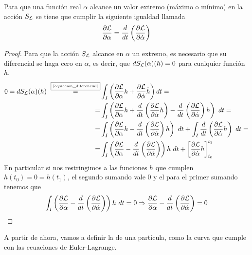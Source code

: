 \begin{theorem}
	Para que una función real $\alpha$ alcance un valor extremo (máximo o mínimo) en la acción $S_{\mathcal{L}}$ se tiene que cumplir la siguiente igualdad llamada 
	\begin{equation}
		\label{eq:euler-lagrange}
		\frac{\partial \mathcal{L}}{\partial \alpha}=\frac{d}{dt}\left( \frac{\partial \mathcal{L}}{\partial \dot{\alpha}} \right)
	\end{equation}
\end{theorem}
\begin{proof}
	Para que la acción $S_{\mathcal{L}}$ alcance en $\alpha$ un extremo, es necesario que su diferencial se haga cero en $\alpha$, es decir, que $dS_{\mathcal{L}}(\alpha)(h)=0$ para cualquier función $h$.
	\begin{equation*}
		\begin{split}
			0 = dS_{\mathcal{L}}(\alpha)(h)~\overset{\fbox{\tiny \ref{eq:accion_diferencial}}}{=}&\int_{I}\left( \frac{\partial \mathcal{L}}{\partial\alpha}h+\frac{\partial \mathcal{L}}{\partial\dot{\alpha}}\dot{h}\right) dt =\\
			= & \int_{I}\left( \frac{\partial \mathcal{L}}{\partial\alpha}h+\frac{d}{dt}\left( \frac{\partial \mathcal{L}}{\partial \dot{\alpha}}h \right)-\frac{d}{dt}\left( \frac{\partial \mathcal{L}}{\partial \dot{\alpha}} \right)h\right)\ dt = \\
			= & \int_{I}\left( \frac{\partial \mathcal{L}}{\partial \alpha}h-\frac{d}{dt}\left( \frac{\partial \mathcal{L}}{\partial \dot{\alpha}} \right)h\right)\ dt +\int_{I}\frac{d}{dt}\left( \frac{\partial \mathcal{L}}{\partial \dot{\alpha}}h \right)\ dt = \\
			= & \int_I\left( \frac{\partial \mathcal{L}}{\partial \alpha}-\frac{d}{dt}\left( \frac{\partial \mathcal{L}}{\partial \dot{\alpha}} \right)\right)h\ dt + \left[ \frac{\partial \mathcal{L}}{\partial \dot{\alpha}}h \right]_{t_0}^{t_1}
		\end{split}
	\end{equation*}
	En particular si nos restringimos a las funciones $h$ que cumplen $h(t_0)=0=h(t_1)$, el segundo sumando vale $0$ y el para el primer sumando tenemos que
	\begin{equation*}
		\int_{I}\left( \frac{\partial \mathcal{L}}{\partial \alpha}-\frac{d}{dt}\left( \frac{\partial \mathcal{L}}{\partial \dot{\alpha}} \right)\right)h\ dt = 0 \Rightarrow \frac{\partial \mathcal{L}}{\partial \alpha}-\frac{d}{dt}\left( \frac{\partial \mathcal{L}}{\partial \dot{\alpha}} \right) = 0
	\end{equation*}
\end{proof}

A partir de ahora, vamos a definir la  de una partícula, como la curva que cumple con las ecuaciones de Euler-Lagrange.

